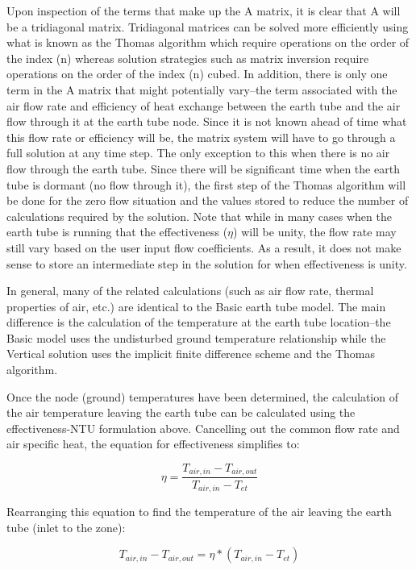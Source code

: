 Upon inspection of the terms that make up the A matrix, it is clear that A will be a tridiagonal matrix.  Tridiagonal matrices can be solved more efficiently using what is known as the Thomas algorithm which require operations on the order of the index (n) whereas solution strategies such as matrix inversion require operations on the order of the index (n) cubed.  In addition, there is only one term in the A matrix that might potentially vary--the term associated with the air flow rate and efficiency of heat exchange between the earth tube and the air flow through it at the earth tube node.  Since it is not known ahead of time what this flow rate or efficiency will be, the matrix system will have to go through a full solution at any time step.  The only exception to this when there is no air flow through the earth tube.  Since there will be significant time when the earth tube is dormant (no flow through it), the first step of the Thomas algorithm will be done for the zero flow situation and the values stored to reduce the number of calculations required by the solution.  Note that while in many cases when the earth tube is running that the effectiveness (\(\eta\)) will be unity, the flow rate may still vary based on the user input flow coefficients.  As a result, it does not make sense to store an intermediate step in the solution for when effectiveness is unity.

In general, many of the related calculations (such as air flow rate, thermal properties of air, etc.) are identical to the Basic earth tube model.  The main difference is the calculation of the temperature at the earth tube location--the Basic model uses the undisturbed ground temperature relationship while the Vertical solution uses the implicit finite difference scheme and the Thomas algorithm.

Once the node (ground) temperatures have been determined, the calculation of the air temperature leaving the earth tube can be calculated using the effectiveness-NTU formulation above.  Cancelling out the common flow rate and air specific heat, the equation for effectiveness simplifies to:

\begin{equation}
\eta = \frac{T_{air,in} - T_{air,out}}{T_{air,in} - T_{et}}
\end{equation}

Rearranging this equation to find the temperature of the air leaving the earth tube (inlet to the zone):

\begin{equation}
T_{air,in} - T_{air,out} = \eta * (T_{air,in} - T_{et})
\end{equation}

